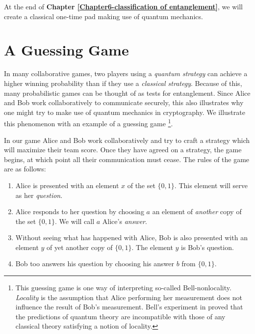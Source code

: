 At the end of \textbf{Chapter \ref{Chapter6-classification of entanglement}}, we will create a classical one-time pad making use of quantum mechanics.







\pagebreak

\section{A Guessing Game} \label{section: bell-nonlocality}
In many collaborative games, two players using a {\emph{quantum strategy}} can achieve a higher winning probability than if they use a {\emph{classical strategy}}. Because of this, many probabilistic games can be thought of as tests for entanglement.  Since Alice and Bob work collaboratively to communicate securely, this also illustrates why one might try to make use of quantum mechanics in cryptography.  We illustrate this phenomenon with an example of a guessing game \footnote{This guessing game is one way of interpreting so-called Bell-nonlocality. \emph{Locality} is the assumption that Alice performing her measurement does not influence the result of Bob's measurement. Bell's experiment in \cite{bell1964}  proved that the predictions of quantum theory are incompatible with those of any classical theory satisfying a notion of locality.}.

In our game Alice and Bob work collaboratively and try to craft a strategy which will maximize their team score.  Once they have agreed on a strategy, the game begins, at which point all their communication must cease.  The rules of the game are as follows:
\begin{enumerate}
\item Alice is presented with an element $x$ of the set $\{0,1\}$.  This element will serve as her {\emph{question}}.
\item Alice responds to her question by choosing $a$ an element of {\emph{another}} copy of the set $\{0,1\}$.  We will call $a$ Alice's {\emph{answer}}. 
\item Without seeing what has happened with Alice, Bob is also presented with an element $y$ of yet another copy of $\{0,1\}$. The element $y$ is Bob's question.
\item Bob too answers his question by choosing his answer $b$ from $\{0,1\}$.
\end{enumerate}

